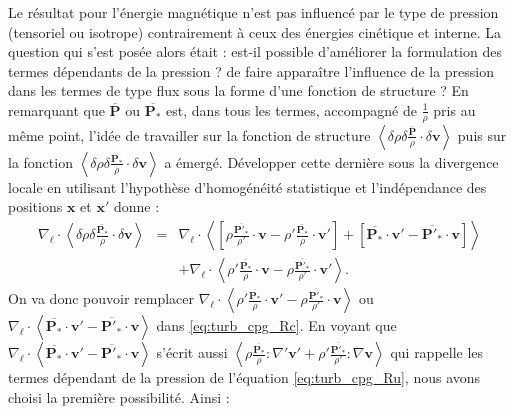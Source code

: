 Le résultat pour l'énergie magnétique n'est pas influencé par le type de pression (tensoriel ou isotrope) contrairement à ceux des énergies cinétique et interne. La question qui s'est posée alors était : est-il possible d'améliorer la formulation des termes dépendants de la pression ? de faire apparaître l'influence de la pression dans les termes de type flux sous la forme d'une fonction de structure ?
En remarquant que $\overline{\boldsymbol{P}}$ ou $\overline{\boldsymbol{P_*}}$ est, dans tous les termes, accompagné de $\frac{1}{\rho}$ pris au même point, l'idée de travailler sur la fonction de structure $\left<\delta \rho \delta \frac{ \overline{\boldsymbol{P}}}{\rho} \cdot \delta \boldsymbol{v} \right>$ puis sur la fonction $\left<\delta \rho \delta \frac{ \overline{\boldsymbol{P_*}} }{\rho} \cdot\delta \boldsymbol{v} \right>$ a émergé. Développer cette dernière sous la divergence locale en utilisant l'hypothèse d'homogénéité statistique et l'indépendance des positions $\boldsymbol{x}$ et  $\boldsymbol{x'}$ donne : 
\begin{eqnarray*}
    \nabla_{\boldsymbol{\ell}} \cdot \left<\delta \rho \delta \frac{ \overline{\boldsymbol{P_*}} }{\rho}  \cdot\delta \boldsymbol{v} \right> &=& \nabla_{\boldsymbol{\ell}} \cdot \left< \left[\rho  \frac{ \overline{\boldsymbol{P'_*}} }{\rho'}   \cdot\boldsymbol{v}  -\rho'  \frac{ \overline{\boldsymbol{P_*}} }{\rho} \cdot \boldsymbol{v'}\right] +  \left[\overline{\boldsymbol{P_*}} \cdot \boldsymbol{v'} - \overline{\boldsymbol{P'_*}}    \cdot\boldsymbol{v} \right] \right> \\
    &&+\nabla_{\boldsymbol{\ell}} \cdot \left<\rho'  \frac{ \overline{\boldsymbol{P_*}} }{\rho} \cdot \boldsymbol{v} - \rho  \frac{ \overline{\boldsymbol{P'_*}} }{\rho'}  \cdot \boldsymbol{v'}  \right> .
\end{eqnarray*}
On va donc pouvoir remplacer $ \nabla_{\boldsymbol{\ell}} \cdot \left< \rho' \frac{ \overline{\boldsymbol{P_*}}}{\rho} \cdot \boldsymbol{v'} -  \rho \frac{\overline{\boldsymbol{P'_*}}}{\rho'} \cdot \boldsymbol{v} \right>$ ou $ \nabla_{\boldsymbol{\ell}} \cdot \left<  \overline{\boldsymbol{P_*}} \cdot \boldsymbol{v'} -  \overline{\boldsymbol{P'_*}} \cdot \boldsymbol{v} \right>$ dans \eqref{eq:turb_cpg_Rc}. En voyant que $ \nabla_{\boldsymbol{\ell}} \cdot \left<  \overline{\boldsymbol{P_*}} \cdot \boldsymbol{v'} -  \overline{\boldsymbol{P'_*}} \cdot \boldsymbol{v} \right>$ s'écrit aussi $\left<  \rho  \frac{ \overline{\boldsymbol{P_*}} }{\rho} : \nabla'\boldsymbol{v'} +   \rho'\frac{ \overline{\boldsymbol{P'_*}} }{\rho'} : \nabla \boldsymbol{v} \right>$ qui rappelle les termes dépendant de la pression de l'équation \eqref{eq:turb_cpg_Ru}, nous avons choisi la première possibilité. Ainsi : 
